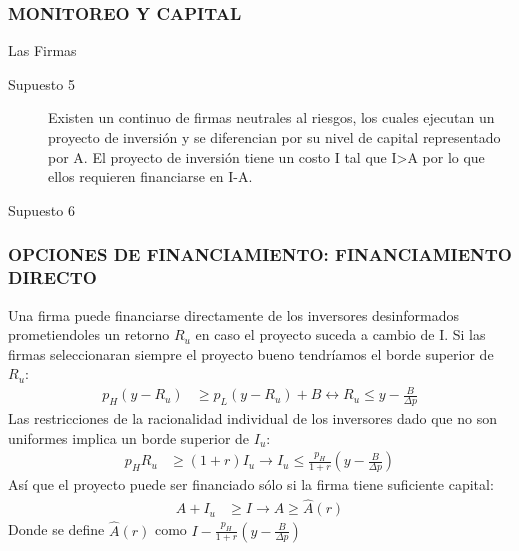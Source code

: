 \documentclass[10pt, xcolor=table, x11names]{beamer}
\begin{document}
\begin{frame}
    \frametitle{{\normalsize MONITOREO Y CAPITAL} {}}
    
    \begin{block} {Las Firmas}
        \begin{description}
             \item[Supuesto 5] Existen un continuo de firmas neutrales al riesgos, los cuales ejecutan un proyecto de inversión y se diferencian por su nivel de capital representado por A. El proyecto de inversión tiene un costo I tal que I>A por lo que ellos requieren financiarse en I-A.
             \item[Supuesto 6]
        \end{description}
          
    \end{block}	

   \end{frame}

\begin{frame}
    \frametitle{{\normalsize OPCIONES DE FINANCIAMIENTO: FINANCIAMIENTO DIRECTO} {}}

 Una firma puede financiarse directamente de los inversores desinformados prometiendoles un retorno $R_{u}$ en caso el proyecto suceda  a cambio de I. Si las firmas seleccionaran siempre el proyecto bueno tendríamos el borde superior de $R_{u}$:
 \begin{align}
 p_{H}(y-R_{u})&\geq p_{L}(y-R_{u})+B\leftrightarrow R_{u}\leq y-\frac{B}{\Delta p}
 \end{align}
 Las restricciones de la racionalidad individual de los inversores dado que no son uniformes implica un borde superior de $I_{u}$:
 \begin{align}
 p_{H}R_{u}&\geq (1+r)I_{u}\rightarrow I_{u}\leq \frac{p_{H}}{1+r}(y-\frac{B}{\Delta p})
 \end{align}
 Así que el proyecto puede ser financiado sólo si la firma tiene suficiente capital:
 \begin{align}
 A+I_{u}&\geq I \rightarrow A \geq \hat{A}(r) 
 \end{align}
 Donde se define $\hat{A}(r)$ como $I-\frac{p_{H}}{1+r}(y-\frac{B}{\Delta p})$
 
 \end{frame}
\end{document}
